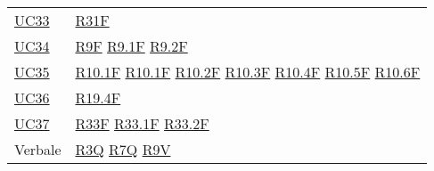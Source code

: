\begin{center}
\begin{longtable}[!h]{m{50px} m{50px}}
        \hyperref[sec:UC33]{UC33}         & \hyperref[tab:RequisitiFunzionali]{R31F}    \\

        \hyperref[sec:UC34]{UC34}         & \hyperref[tab:RequisitiFunzionali]{R9F}
        \newline \hyperref[tab:RequisitiFunzionali]{R9.1F}
        \newline \hyperref[tab:RequisitiFunzionali]{R9.2F}                              \\

        \hyperref[sec:UC35]{UC35}         & \hyperref[tab:RequisitiFunzionali]{R10.1F}
        \newline \hyperref[tab:RequisitiFunzionali]{R10.1F}
        \newline \hyperref[tab:RequisitiFunzionali]{R10.2F}
        \newline \hyperref[tab:RequisitiFunzionali]{R10.3F}
        \newline \hyperref[tab:RequisitiFunzionali]{R10.4F}
        \newline \hyperref[tab:RequisitiFunzionali]{R10.5F}
        \newline \hyperref[tab:RequisitiFunzionali]{R10.6F}                             \\

        \hyperref[sec:UC36]{UC36}         & \hyperref[tab:RequisitiFunzionali]{R19.4F}  \\
        \hyperref[sec:UC37]{UC37}         & \hyperref[tab:RequisitiFunzionali]{R33F}
        \newline      \hyperref[tab:RequisitiFunzionali]{R33.1F}
        \newline \hyperref[tab:RequisitiFunzionali]{R33.2F}                             \\

        Verbale                           & \hyperref[tab:RequisitiQualita]{R3Q}
        \newline \hyperref[tab:RequisitiQualita]{R7Q}
        \newline \hyperref[tab:RequisitiQualita]{R9V}                                   \\
    \end{longtable}
\end{center}
